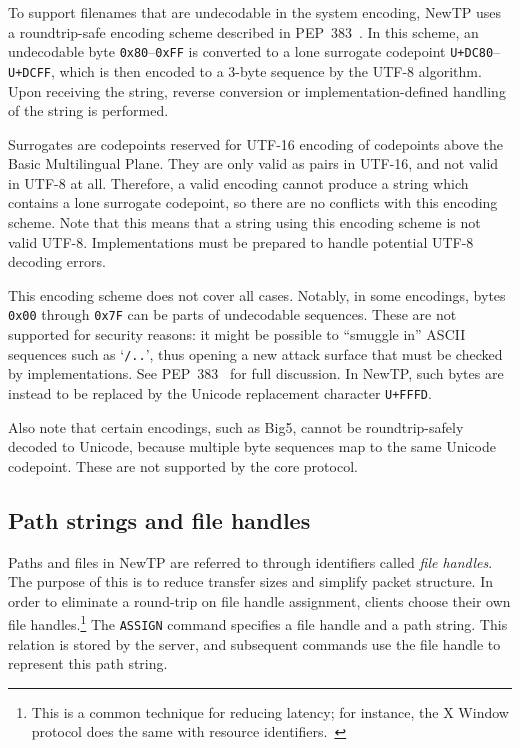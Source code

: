 To support filenames that are undecodable in the system encoding, NewTP uses a roundtrip-safe encoding scheme
described in PEP~383~\cite{pep383}. In this scheme, an undecodable byte {\tt 0x80}--{\tt 0xFF} is converted to
a lone surrogate codepoint {\tt U+DC80}--{\tt U+DCFF}, which is then encoded to a 3-byte sequence by the UTF-8
algorithm. Upon receiving the string, reverse conversion or implementation-defined handling of the string is
performed.

Surrogates are codepoints reserved for UTF-16 encoding of codepoints above the Basic Multilingual Plane. They
are only valid as pairs in UTF-16, and not valid in UTF-8 at all. Therefore, a valid encoding cannot produce
a string which contains a lone surrogate codepoint, so there are no conflicts with this encoding scheme. Note
that this means that a string using this encoding scheme is not valid UTF-8. Implementations must be prepared
to handle potential UTF-8 decoding errors.

This encoding scheme does not cover all cases. Notably, in some encodings, bytes {\tt 0x00} through {\tt 0x7F}
can be parts of undecodable sequences. These are not supported for security reasons: it might be possible to
``smuggle in'' ASCII sequences such as `{\tt /..}', thus opening a new attack surface that must be checked by
implementations. See PEP~383~\cite{pep383} for full discussion. In NewTP, such bytes are instead to be
replaced by the Unicode replacement character {\tt U+FFFD}.

Also note that certain encodings, such as Big5, cannot be roundtrip-safely decoded to Unicode, because
multiple byte sequences map to the same Unicode codepoint. These are not supported by the core protocol.

%

\subsection{Path strings and file handles}
\label{ssec:paths}

Paths and files in NewTP are referred to through identifiers called {\it file handles}. The purpose of this is
to reduce transfer sizes and simplify packet structure. In order to eliminate a round-trip on file handle
assignment, clients choose their own file handles.\footnote{This is a common technique for reducing latency;
for instance, the X Window protocol does the same with resource identifiers.~\cite{xwindow}} The {\tt ASSIGN}
command specifies a file handle and a path string. This relation is stored by the server, and subsequent
commands use the file handle to represent this path string.

